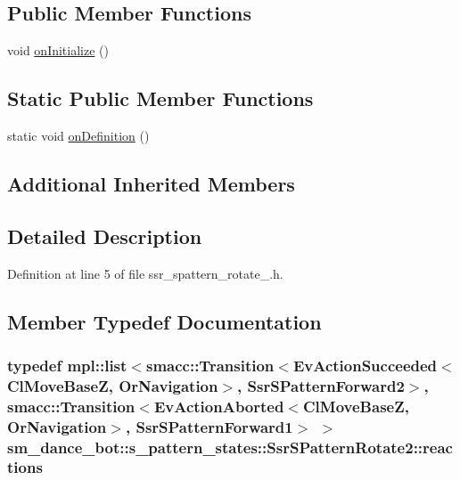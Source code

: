 \subsection*{Public Member Functions}
\begin{DoxyCompactItemize}
\item 
void \hyperlink{structsm__dance__bot_1_1s__pattern__states_1_1SsrSPatternRotate2_a76d42f058a37eb3c0e7915f8b7ee8974}{on\+Initialize} ()
\end{DoxyCompactItemize}
\subsection*{Static Public Member Functions}
\begin{DoxyCompactItemize}
\item 
static void \hyperlink{structsm__dance__bot_1_1s__pattern__states_1_1SsrSPatternRotate2_ae68524a6e0b485f6a79ea132cda08f4b}{on\+Definition} ()
\end{DoxyCompactItemize}
\subsection*{Additional Inherited Members}


\subsection{Detailed Description}


Definition at line 5 of file ssr\+\_\+spattern\+\_\+rotate\+\_.\+h.



\subsection{Member Typedef Documentation}
\subsubsection[{\texorpdfstring{reactions}{reactions}}]{\setlength{\rightskip}{0pt plus 5cm}typedef mpl\+::list$<${\bf smacc\+::\+Transition}$<$Ev\+Action\+Succeeded$<${\bf Cl\+Move\+BaseZ}, {\bf Or\+Navigation}$>$, {\bf Ssr\+S\+Pattern\+Forward2}$>$, {\bf smacc\+::\+Transition}$<$Ev\+Action\+Aborted$<${\bf Cl\+Move\+BaseZ}, {\bf Or\+Navigation}$>$, {\bf Ssr\+S\+Pattern\+Forward1}$>$ $>$ {\bf sm\+\_\+dance\+\_\+bot\+::s\+\_\+pattern\+\_\+states\+::\+Ssr\+S\+Pattern\+Rotate2\+::reactions}}\hypertarget{structsm__dance__bot_1_1s__pattern__states_1_1SsrSPatternRotate2_a9d2e87a10542543510a4b4030d3a5c54}{}\label{structsm__dance__bot_1_1s__pattern__states_1_1SsrSPatternRotate2_a9d2e87a10542543510a4b4030d3a5c54}


